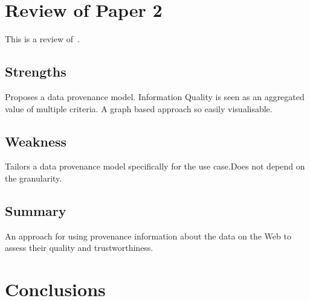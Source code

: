 \documentclass[11pt,twocolumn,a4paper]{article}
\begin{document}
\section{Review of Paper 2}

This is a review of~\cite{Hartig:2009}.



\subsection{Strengths}
Proposes a data provenance model. Information Quality is seen as an aggregated value of multiple criteria. A graph based approach so easily visualisable.
\subsection{Weakness}
Tailors a data provenance model specifically for the use case.Does not depend on the granularity.
\subsection{Summary}
An approach for using provenance information about the data on the Web to assess their quality and trustworthiness.


\section{Conclusions}






\end{document}
